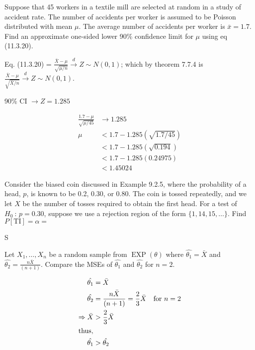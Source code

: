 \documentclass[answers]{exam}
\begin{document}
\begin{questions}
\question 
Suppose that 45 workers in a textile mill are selected at random in a study of accident rate. 
The number of accidents per worker is assumed to be Poisson distributed with mean \(\mu\). 
The average number of accidents per worker is \(\bar{x}=1.7\).
Find an approximate one-sided lower 90\% confidence limit for \(\mu\) 
using eq (11.3.20).
\begin{solution}
	Eq. (11.3.20) = \(\frac{\bar{X}-\mu}{\sqrt{\mu/n}}\overset{d}{\rightarrow} Z\sim N(0,1)\); 
	which by theorem 7.7.4 is 
	\(\frac{\bar{X}-\mu}{\sqrt{\bar{X}/n}}\overset{d}{\rightarrow} Z\sim N(0,1)\).
	
	90\% CI $\rightarrow Z = 1.285$ 
	
	\begin{align*}
		\frac{1.7-\mu}{\sqrt{\mu/45}} &\rightarrow 1.285 \\
		\mu &< 1.7-1.285(\sqrt{1.7/45}) \\
		&< 1.7-1.285(\sqrt{0.194}) \\
		&< 1.7-1.285(0.24975) \\
		&< 1.45024
	\end{align*}
\end{solution}

\question 
Consider the biased coin discussed in Example 9.2.5, where the probability of a head, 
\(p\), is known to be 0.2, 0.30, or 0.80. 
The coin is tossed repeatedly, 
and we let \(X\) be the number of tosses required to obtain the first head. 
For a test of \(H_0\ :\,p=0.30\), suppose we use a rejection region of the form
\(\{1,14,15,\ldots\}\). Find \(P\left[\text{TI}\right]=\alpha=\)
\begin{solution}
	S
	
\end{solution}

\question 
Let \(X_1,\ldots,X_n\) be a random sample from \(\operatorname{EXP}(\theta)\) where \(\hat{\theta_1}=\bar{X}\) and \(\hat{\theta_2}=\frac{n\bar{X}}{(n+1)}\). 
Compare the MSEs of \(\hat{\theta_1}\) and \(\hat{\theta_2}\) for \(n=2\).
\begin{solution}
	\begin{align*}
		\hat{\theta_1} &= \bar{X} \\
		\hat{\theta_2} & = \frac{n\bar{X}}{(n+1)} 
		= \frac{2}{3}\bar{X} \quad \text{for } n=2 \\
		\Rightarrow \bar{X} &> \frac{2}{3}\bar{X} \\
		\intertext{thus,}
		\hat{\theta_1} &> \hat{\theta_2}
	\end{align*}
	

\end{solution}
\end{questions}
\end{document}
